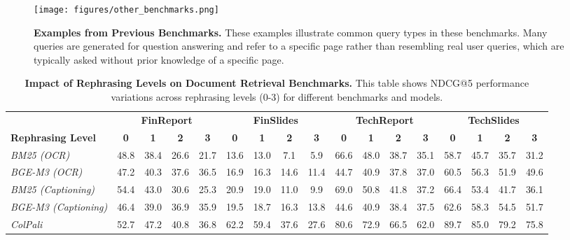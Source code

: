 \hspace{-10cm}
\begin{figure*}[h!]
    \texttt{[image: figures/other\_benchmarks.png]} %
    \caption{\textbf{Examples from Previous Benchmarks.} These examples illustrate common query types in these benchmarks. Many queries are generated for question answering and refer to a specific page rather than resembling real user queries, which are typically asked without prior knowledge of a specific page.}

    \label{fig:others_examples} 
\end{figure*}

\clearpage
\begin{table*}[th]
\footnotesize
\renewcommand{\arraystretch}{1.5} %
\setlength\tabcolsep{4pt} %
\caption{
\textbf{Impact of Rephrasing Levels on Document Retrieval Benchmarks.}
This table shows NDCG@5 performance variations across rephrasing levels (0-3) for different benchmarks and models.}
\begin{tabular*}{1.03\linewidth}{@{\extracolsep{\fill}}l|cccc|cccc|cccc|cccc}
\toprule
 & \multicolumn{4}{c|}{\textbf{FinReport}} & \multicolumn{4}{c|}{\textbf{FinSlides}} & \multicolumn{4}{c|}{\textbf{TechReport}} & \multicolumn{4}{c}{\textbf{TechSlides}} \\
\textbf{Rephrasing Level} & \textbf{0} & \textbf{1} & \textbf{2} & \textbf{3} & \textbf{0} & \textbf{1} & \textbf{2} & \textbf{3} & \textbf{0} & \textbf{1} & \textbf{2} & \textbf{3} & \textbf{0} & \textbf{1} & \textbf{2} & \textbf{3} \\
\midrule

\textit{BM25 (OCR)} & 
48.8 & 38.4 & 26.6 & 21.7 &
13.6 & 13.0 & 7.1 & 5.9 &
66.6 & 48.0 & 38.7 & 35.1 &
58.7 & 45.7 & 35.7 & 31.2 \\

\textit{BGE-M3 (OCR)} & 
47.2 & 40.3 & 37.6 & 36.5 &
16.9 & 16.3 & 14.6 & 11.4 &
44.7 & 40.9 & 37.8 & 37.0 &
60.5 & 56.3 & 51.9 & 49.6  \\

\textit{BM25 (Captioning)} & 
54.4 & 43.0 & 30.6 & 25.3 &
20.9 & 19.0 & 11.0 & 9.9 &
69.0 & 50.8 & 41.8 & 37.2 &
66.4 & 53.4 & 41.7 & 36.1 \\

\textit{BGE-M3 (Captioning)} & 
46.4 & 39.0 & 36.9 & 35.9 &
19.5 & 18.7 & 16.3 & 13.8 &
44.6 & 40.9 & 38.4 & 37.5 &
62.6 & 58.3 & 54.5 & 51.7 \\
\addlinespace
\addlinespace
\textit{ColPali} & 
52.7 & 47.2 & 40.8 & 36.8 &  
62.2 & 59.4 & 37.6 & 27.6 & 
80.6 & 72.9 & 66.5 & 62.0 & 
89.7 & 85.0 & 79.2 & 75.8 \\


\end{tabular*}
\end{table*}
